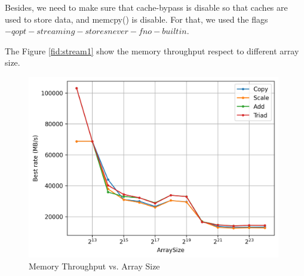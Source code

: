 \documentclass[article]{scrartcl}
\begin{document}
Besides, we need to make sure that cache-bypass is disable so that caches are used to store data, and memcpy() is disable. For that, we used the flags $-qopt-streaming-stores never -fno-builtin$.

The Figure \ref{fid:stream1} show the memory throughput respect to different array size. 
\begin{figure}[htpb]
    \centering
    \includegraphics[width=\textwidth,height=8cm,keepaspectratio=true]{../figs/2.4_StreamCaches.png}
    \caption{Memory Throughput vs. Array Size}
    \label{fig:stream1}
\end{figure}
\end{document}
